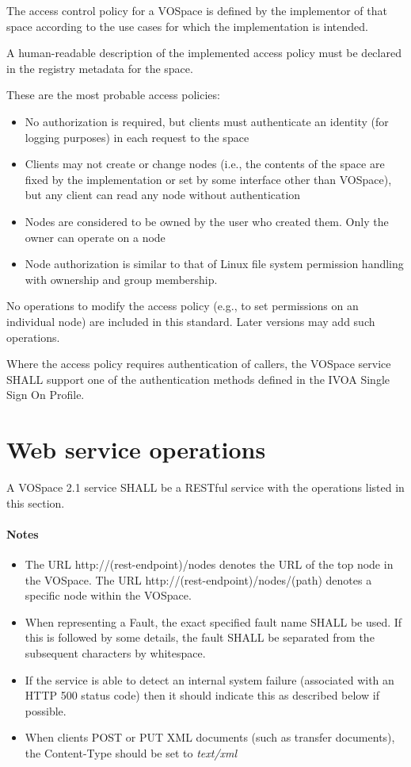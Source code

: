 \documentclass[11pt,a4paper]{ivoa}
\begin{document}
The access control policy for a VOSpace is defined by the implementor of that space according to the use cases for which the implementation is intended.

A human-readable description of the implemented access policy must be declared in the registry metadata for the space.

These are the most probable access policies:

\begin{itemize}
    \item No authorization is required, but clients must authenticate an identity (for logging purposes) in each request to the space
    \item Clients may not create or change nodes (i.e., the contents of the space are fixed by the implementation or set by some interface other than VOSpace), but any client can read any node without authentication
    \item Nodes are considered to be owned by the user who created them. Only the owner can operate on a node
    \item Node authorization is similar to that of Linux file system permission handling with ownership and group membership.
\end{itemize}

No operations to modify the access policy (e.g., to set permissions on an individual node) are included in this standard. Later versions may add such operations.

Where the access policy requires authentication of callers, the VOSpace service SHALL support one of the authentication methods defined in the IVOA Single Sign On Profile.

\section{Web service operations}
\label{sec:web service operations}

A VOSpace 2.1 service SHALL be a RESTful service with the operations listed in this section.

\paragraph{Notes}
\begin{itemize}
    \item The URL http://(rest-endpoint)/nodes denotes the URL of the top node in the VOSpace. The URL http://(rest-endpoint)/nodes/(path) denotes a specific node within the VOSpace.
    \item When representing a Fault, the exact specified fault name SHALL be used. If this is followed by some details, the fault SHALL be separated from the subsequent characters by whitespace.
    \item If the service is able to detect an internal system failure (associated with an HTTP 500 status code) then it should indicate this as described below if possible.
    \item When clients POST or PUT XML documents (such as transfer documents), the Content-Type should be set to \emph{text/xml}
\end{itemize}
\end{document}
